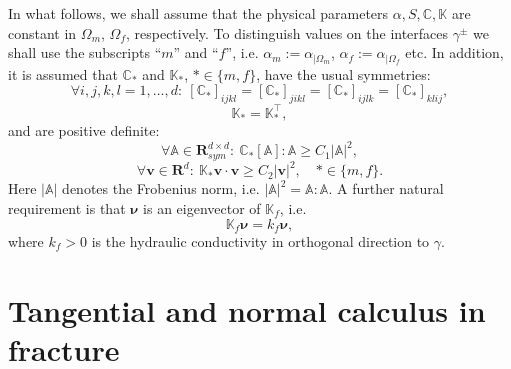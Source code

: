 \documentclass[a4paper]{article}
\def\nnu{\vc\nu}
\def\Real{{\mathbf R}}
\def\tn#1{{\mathbb{#1}}}    %
\def\vc#1{\mathbf{\boldsymbol{#1}}}     %
\def\vv{\vc v}
\newcommand{\eq}[1]{\begin{equation}#1\end{equation}}
\begin{document}
In what follows, we shall assume that the physical parameters $\alpha,S,\tn C,\tn K$ are constant in $\Omega_m$, $\Omega_f$, respectively.
To distinguish values on the interfaces $\gamma^\pm$ we shall use the subscripts ``$m$'' and ``$f$'', i.e. $\alpha_m := \alpha_{|\Omega_m}$, $\alpha_f := \alpha_{|\Omega_f}$ etc.
In addition, it is assumed that $\tn C_*$ and $\tn K_*$, $*\in\{m,f\}$, have the usual symmetries:
\eq{ \forall i,j,k,l=1,\ldots,d:~ [\tn C_*]_{ijkl}=[\tn C_*]_{jikl}=[\tn C_*]_{ijlk}=[\tn C_*]_{klij}, }
\eq{ \tn K_* = \tn K_*^\top, }
and are positive definite:
\eq{ \label{eq:pos_def_C} \forall\tn A\in\Real^{d\times d}_{sym}:~\tn C_*[\tn A]:\tn A \ge C_1|\tn A|^2, }
\eq{ \forall\vv\in\Real^d:~\tn K_*\vv\cdot\vv \ge C_2|\vv|^2,\quad *\in\{m,f\}. }
Here $|\tn A|$ denotes the Frobenius norm, i.e. $|\tn A|^2=\tn A:\tn A$.
A further natural requirement is that $\nnu$ is an eigenvector of $\tn K_f$, i.e.
\eq{\label{eq:normal_conductivity} \tn K_f\nnu = k_f\nnu, }
where $k_f>0$ is the hydraulic conductivity in orthogonal direction to $\gamma$.




\section{Tangential and normal calculus in fracture}
\end{document}
